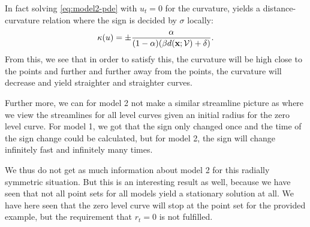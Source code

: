 In fact solving \eqref{eq:model2-pde} with $u_t=0$ for the curvature, yields a distance-curvature relation where the sign is decided by $\sigma$ locally: 
\begin{equation}
    \kappa (u) = \pm \frac{\alpha}{(1-\alpha)(\beta d(\textbf{x};\mathcal{V})+\delta)}.
    \label{eq:dist-curv-relation-m2}
\end{equation}
From this, we see that in order to satisfy this, the curvature will be high close to the points and further and further away from the points, the curvature will decrease and yield straighter and straighter curves.

Further more, we can for model 2 not make a similar streamline picture as  where we view the streamlines for all level curves given an initial radius for the zero level curve. For model 1, we got that the sign only changed once and the time of the sign change could be calculated, but for model 2, the sign will change infinitely fast and infinitely many times. 

We thus do not get as much information about model 2 for this radially symmetric situation. But this is an interesting result as well, because we have seen that not all point sets for all models yield a stationary solution at all. We have here seen that the zero level curve will stop at the point set for the provided example, but the requirement that $r_t=0$ is not fulfilled.

